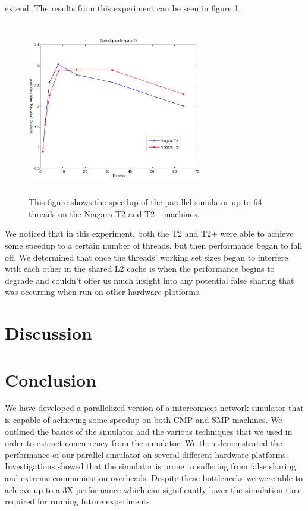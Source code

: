 \documentclass[twocolumn]{article}
\begin{document}
extend.  The results from this experiment can be seen in figure
\ref{niagara}.
\begin{figure}[h]
\centering
\includegraphics[height=3in,width=3in]{niagara.eps}
\caption{\label{niagara}This figure shows the speedup of the parallel simulator
up to 64 threads on the Niagara T2 and T2+ machines.}
\end{figure}
We noticed that in this experiment, both the T2 and T2+ were able to
achieve some speedup to a certain number of threads, but then performance
began to fall off.  We determined that once the threads' working set sizes
began to interfere with each other in the shared L2 cache is when the
performance begins to degrade and couldn't offer us much insight into  any potential false sharing that was occurring when run on other
hardware platforms.

\section{Discussion \label{disc}}


\section{Conclusion \label{conc}}
We have developed a parallelized version of a interconnect network
simulator that is capable of achieving some speedup on both CMP and SMP
machines.  We outlined the basics of the simulator and the various
techniques that we used in order to extract concurrency from the
simulator.  We then demonstrated the performance of our parallel simulator
on several different hardware platforms.  Investigations showed that the
simulator is prone to suffering from false sharing and extreme
communication overheads.  Despite these bottlenecks we were able to
achieve up to a 3X performance which can significantly lower the
simulation time required for running future experiments.







\end{document}
